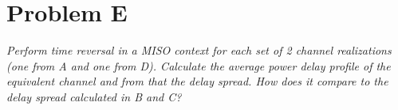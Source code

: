 \section{Problem E}
\textit{Perform time reversal in a MISO context for each set of 2 channel realizations (one from A and one from D). Calculate the average power delay profile of the equivalent channel and from that the delay spread. How does it compare to the delay spread calculated in B and C? }